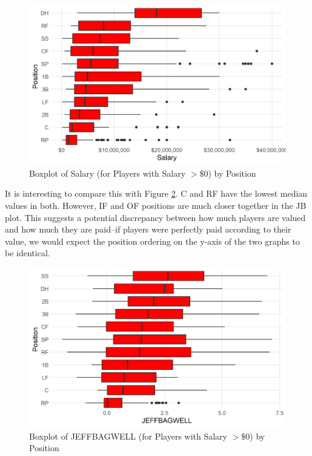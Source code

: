 \documentclass{article}
\begin{document}
\begin{figure}[H]
\caption{Boxplot of Salary (for Players with Salary $> \$0$) by Position}
\label{fig:salary_position_boxplot}
\centering
\includegraphics[width=0.7\paperwidth, scale=1.25]{salary_position_boxplots.png}
\end{figure}

It is interesting to compare this with Figure \ref{fig:war_position_boxplot}. C and RF have the lowest median values in both. However, IF and OF positions are much closer together in the JB plot. This suggests a potential discrepancy between how much players are valued and how much they are paid--if players were perfectly paid according to their value, we would expect the position ordering on the y-axis of the two graphs to be identical.  

\begin{figure}[H]
\caption{Boxplot of JEFFBAGWELL (for Players with Salary $> \$0$) by Position}
\label{fig:war_position_boxplot}
\centering
\includegraphics[width=0.7\paperwidth, scale=1.25]{war_position_boxplots.png}
\end{figure}
\end{document}
